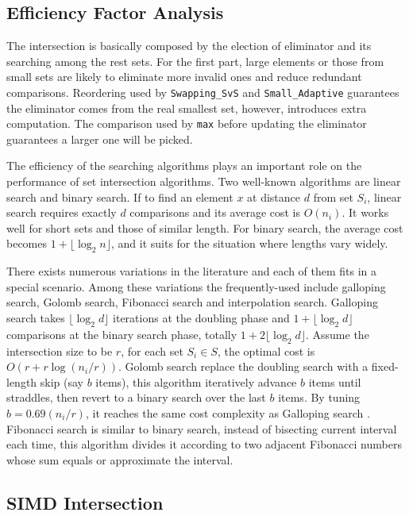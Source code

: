 \documentclass[runningheads,a4paper]{llncs}
\begin{document}
\subsection{Efficiency Factor Analysis}
The intersection is basically composed by the election of eliminator and its searching among the rest sets.
For the first part, large elements or those from small sets are likely to eliminate more invalid ones and reduce redundant comparisons.
Reordering used by \texttt{Swapping\_SvS} and \texttt{Small\_Adaptive} guarantees the eliminator comes from the real smallest set, however, introduces extra computation.
The comparison used by \texttt{max} before updating the eliminator guarantees a larger one will be picked.

The efficiency of the searching algorithms plays an important role on the performance of set intersection algorithms.
Two well-known algorithms are linear search and binary search.
If to find an element $ x $ at distance $ d $ from set $ S_i $, linear search requires exactly $ d $ comparisons and its average cost is $ O(n_i) $.
It works well for short sets and those of similar length.
For binary search, the average cost becomes $ 1 + \lfloor \log_2 n \rfloor $, and it suits for the situation where lengths vary widely.

There exists numerous variations in the literature and each of them fits in a special scenario.
Among these variations the frequently-used include galloping search, Golomb search, Fibonacci search and interpolation search.
Galloping search takes $ \lfloor \log_2 d \rfloor $ iterations at the doubling phase and $ 1 + \lfloor \log_2 d \rfloor $ comparisons at the binary search phase, totally $ 1 + 2 \lfloor  \log_2 d \rfloor $.
Assume the intersection size to be $ r $, for each set $ S_i \in S$, the optimal cost is $ O(r+r\log (n_i/r)) $.
Golomb search replace the doubling search with a fixed-length skip (say $ b $ items), this algorithm iteratively advance $ b $ items until straddles, then revert to a binary search over the last $ b $ items.
By tuning $ b =0.69(n_i/r) $, it reaches the same cost complexity as Galloping search \cite{Hwang1972A}.
Fibonacci search is similar to binary search, instead of bisecting current interval each time, this algorithm divides it according to two adjacent Fibonacci numbers whose sum equals or approximate the interval.
\subsection{SIMD Intersection}
\end{document}
